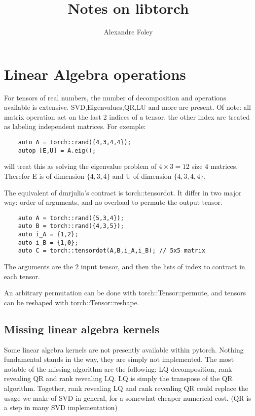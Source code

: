 \documentclass[15pt]{article}
\begin{document}
\title{Notes on libtorch}
\author{Alexandre Foley}

\maketitle

\tableofcontents
\section{Linear Algebra operations}
For tensors of real numbers, the number of decomposition and operations available is extensive. SVD,Eigenvalues,QR,LU and more are present. Of note: all matrix operation act on the last 2 indices of a tensor, the other index are treated as labeling independent matrices. For exemple:
\begin{verbatim}
    auto A = torch::rand({4,3,4,4});
    autop [E,U] = A.eig();
\end{verbatim}
will treat this as solving the eigenvalue problem of $4\times3=12$ size $4$ matrices. Therefor E is of dimension $\{4,3,4\}$ and U of dimension $\{ 4,3,4,4\}$.

The equivalent of dmrjulia's contract is torch::tensordot. It differ in two major way: order of arguments, and no overload to permute the output tensor.
\begin{verbatim}
    auto A = torch::rand({5,3,4});
    auto B = torch::rand({4,3,5});
    auto i_A = {1,2};
    auto i_B = {1,0};
    auto C = torch::tensordot(A,B,i_A,i_B); // 5x5 matrix
\end{verbatim}
The arguments are the 2 input tensor, and then the lists of index to contract in each tensor.

An arbitrary permutation can be done with torch::Tensor::permute, and tensors can be reshaped with torch::Tensor::reshape.
\subsection{Missing linear algebra kernels}

Some linear algebra kernels are not presently available within pytorch. Nothing fundamental stands in the way, they are simply not implemented.
The most notable of the missing algorithm are the following: LQ decomposition, rank-revealing QR and rank revealing LQ. LQ is simply the transpose of the QR algorithm.
Together, rank revealing LQ and rank revealing QR could replace the usage we make of SVD in general, for a somewhat cheaper numerical cost. (QR is a step in many SVD implementation)
\end{document}
